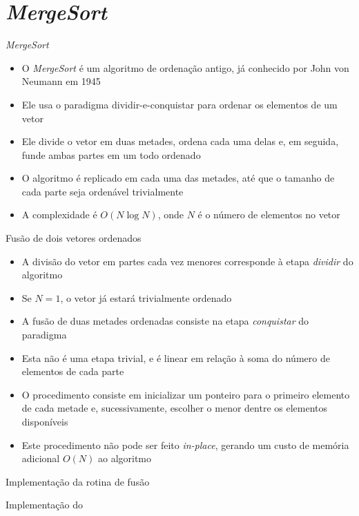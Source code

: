 \section{\it MergeSort}

\begin{frame}[fragile]{\it MergeSort}

    \begin{itemize}
        \item O \textit{MergeSort} é um algoritmo de ordenação antigo, já conhecido por
            John von Neumann em 1945

        \item Ele usa o paradigma dividir-e-conquistar para ordenar os elementos de um
            vetor

        \item Ele divide o vetor em duas metades, ordena cada uma delas e, em seguida,
           funde ambas partes em um todo ordenado

        \item O algoritmo é replicado em cada uma das metades, até que o tamanho de cada
            parte seja ordenável trivialmente 

        \item A complexidade é $O(N\log N)$, onde $N$ é o número de elementos no vetor
    \end{itemize}

\end{frame}

\begin{frame}[fragile]{Fusão de dois vetores ordenados}

    \begin{itemize}
        \item A divisão do vetor em partes cada vez menores corresponde à etapa 
            \textit{dividir} do algoritmo

        \item Se $N = 1$, o vetor já estará trivialmente ordenado

        \item A fusão de duas metades ordenadas consiste na etapa \textit{conquistar} do
            paradigma

        \item Esta não é uma etapa trivial, e é linear em relação à soma do número de elementos
            de cada parte

        \item O procedimento consiste em inicializar um ponteiro para o primeiro elemento de 
            cada metade e, sucessivamente, escolher o menor dentre os elementos disponíveis

        \item Este procedimento não pode ser feito \textit{in-place}, gerando um custo de
            memória adicional $O(N)$ ao algoritmo
    \end{itemize}

\end{frame}



\begin{frame}[fragile]{Implementação da rotina de fusão}
\end{frame}



\begin{frame}[fragile]{Implementação do }
\end{frame}
